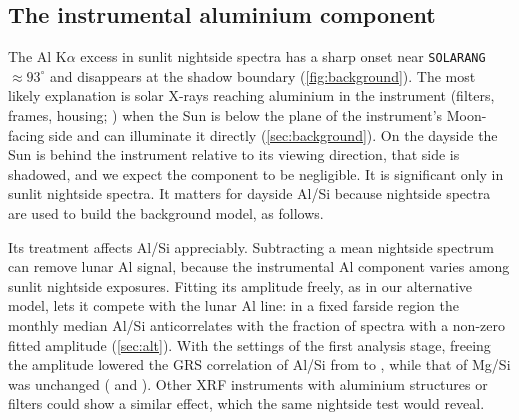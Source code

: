 \begin{table}[t]
\centering
\caption{Median change (\%) in Mg/Si and Al/Si (16th and 84th percentiles in parentheses) when CLASS spectra are refitted with XSM-derived solar spectra instead of the GOES isothermal spectrum, by relative flare enhancement $F$, the GOES XRS-B flux divided by its 12-hour running 10th percentile; $N$ is the number of spectra with good fits under the GOES, XSM isothermal and XSM two-temperature spectra (\XsmNBoth{} in total), so all columns use the same spectra; temperatures are medians.}\label{tab:xsmregimes}
\small

\end{table}

\subsection{The instrumental aluminium component}
The Al K$\alpha$ excess in sunlit nightside spectra has a sharp onset near \texttt{SOLARANG} $\approx93^\circ$ and disappears at the shadow boundary (\cref{fig:background}). The most likely explanation is solar X-rays reaching aluminium in the instrument (filters, frames, housing; \citealp{Pillai2021}) when the Sun is below the plane of the instrument's Moon-facing side and can illuminate it directly (\cref{sec:background}). On the dayside the Sun is behind the instrument relative to its viewing direction, that side is shadowed, and we expect the component to be negligible. It is significant only in sunlit nightside spectra. It matters for dayside Al/Si because nightside spectra are used to build the background model, as follows.

Its treatment affects Al/Si appreciably. Subtracting a mean nightside spectrum can remove lunar Al signal, because the instrumental Al component varies among sunlit nightside exposures. Fitting its amplitude freely, as in our alternative model, lets it compete with the lunar Al line: in a fixed farside region the monthly median Al/Si anticorrelates with the fraction of spectra with a non-zero fitted amplitude (\cref{sec:alt}). With the settings of the first analysis stage, freeing the amplitude lowered the GRS correlation of Al/Si from \GrsAlRvThree{} to \GrsAlRvTwo, while that of Mg/Si was unchanged (\GrsMgRvThree{} and \GrsMgRvTwo). Other XRF instruments with aluminium structures or filters could show a similar effect, which the same nightside test would reveal.

